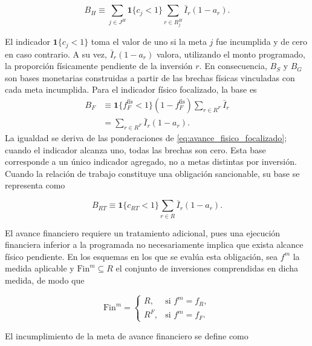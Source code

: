 \begin{equation}
\label{eq:base_fisica_generica}
B_H
\equiv
\sum_{j\in J^{H}}
\mathbf{1}\{c_j<1\}
\sum_{r\in R_j^{H}}
\bar I_r(1-a_r).
\end{equation}

El indicador \(\mathbf{1}\{c_j<1\}\) toma el valor de uno si la meta \(j\) fue incumplida y de cero en caso contrario. A su vez, \(\bar I_r(1-a_r)\) valora, utilizando el monto programado, la proporción físicamente pendiente de la inversión \(r\). En consecuencia, \(B_S\) y \(B_G\) son bases monetarias construidas a partir de las brechas físicas vinculadas con cada meta incumplida. Para el indicador físico focalizado, la base es
\begin{equation}
\label{eq:base_fisica_focalizada}
\begin{aligned}
B_F
&\equiv
\mathbf{1}\{f_F^{\mathrm{fis}}<1\}
\left(1-f_F^{\mathrm{fis}}\right)
\sum_{r\in R^{F}}\bar I_r
\\
&=\sum_{r\in R^{F}}\bar I_r(1-a_r).
\end{aligned}
\end{equation}
La igualdad se deriva de las ponderaciones de \eqref{eq:avance_fisico_focalizado}; cuando el indicador alcanza uno, todas las brechas son cero. Esta base corresponde a un único indicador agregado, no a metas distintas por inversión. Cuando la relación de trabajo constituye una obligación sancionable, su base se representa como

\begin{equation}
\label{eq:base_rt}
B_{RT}
\equiv
\mathbf{1}\{c_{RT}<1\}
\sum_{r\in R}
\bar I_r(1-a_r).
\end{equation}

El avance financiero requiere un tratamiento adicional, pues una ejecución financiera inferior a la programada no necesariamente implica que exista alcance físico pendiente. En los esquemas en los que se evalúa esta obligación, sea \(f^m\) la medida aplicable y \(\mathrm{Fin}^m\subseteq R\) el conjunto de inversiones comprendidas en dicha medida, de modo que

\begin{equation}
\label{eq:universo_financiero}
\mathrm{Fin}^m
=
\begin{cases}
R,
&
\text{si } f^m=f_R,
\\[4pt]
R^{F},
&
\text{si } f^m=f_F.
\end{cases}
\end{equation}

El incumplimiento de la meta de avance financiero se define como

